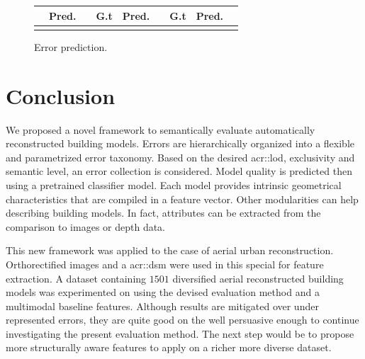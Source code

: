 \documentclass[runningheads]{llncs}
\begin{document}
\begin{figure}
\begin{center}
\begin{tabular}{| x{1cm} | x{.75cm} | x{.75cm} | x{.5cm} | x{.75cm} | x{.75cm} | x{.5cm} | x{.75cm} | x{.75cm} |}
 & \textbf{Pred.} & & \textbf{G.t} & \textbf{Pred.} & & \textbf{G.t} & \textbf{Pred.}\\
            \hline
            & & & & & & & & \\
            \hline
		\end{tabular}
        \caption{\label{fig::results} Error prediction.}
	\end{center}
\end{figure}

\section{Conclusion}

We proposed a novel framework to semantically evaluate automatically reconstructed building models. Errors are hierarchically organized into a flexible and parametrized error taxonomy. Based on the desired \acrshort{acr::lod}, exclusivity and semantic level, an error collection is considered. Model quality is predicted then using a pretrained classifier model. Each model provides intrinsic geometrical characteristics that are compiled in a feature vector. Other modularities can help describing building models. In fact, attributes can be extracted from the comparison to images or depth data.

This new framework was applied to the case of aerial urban reconstruction. Orthorectified images and a \acrshort{acr::dsm} were used in this special for feature extraction. A dataset containing $1501$ diversified aerial reconstructed building models was experimented on using the devised evaluation method and a multimodal baseline features. Although results are mitigated over under represented errors, they are quite good on the well  persuasive enough to continue investigating the present evaluation method. The next step would be to propose more structurally aware features to apply on a richer more diverse dataset.


\end{document}
